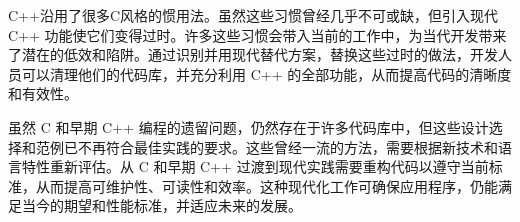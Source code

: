 C++沿用了很多C风格的惯用法。虽然这些习惯曾经几乎不可或缺，但引入现代 C++ 功能使它们变得过时。许多这些习惯会带入当前的工作中，为当代开发带来了潜在的低效和陷阱。通过识别并用现代替代方案，替换这些过时的做法，开发人员可以清理他们的代码库，并充分利用 C++ 的全部功能，从而提高代码的清晰度和有效性。

虽然 C 和早期 C++ 编程的遗留问题，仍然存在于许多代码库中，但这些设计选择和范例已不再符合最佳实践的要求。这些曾经一流的方法，需要根据新技术和语言特性重新评估。从 C 和早期 C++ 过渡到现代实践需要重构代码以遵守当前标准，从而提高可维护性、可读性和效率。这种现代化工作可确保应用程序，仍能满足当今的期望和性能标准，并适应未来的发展。
